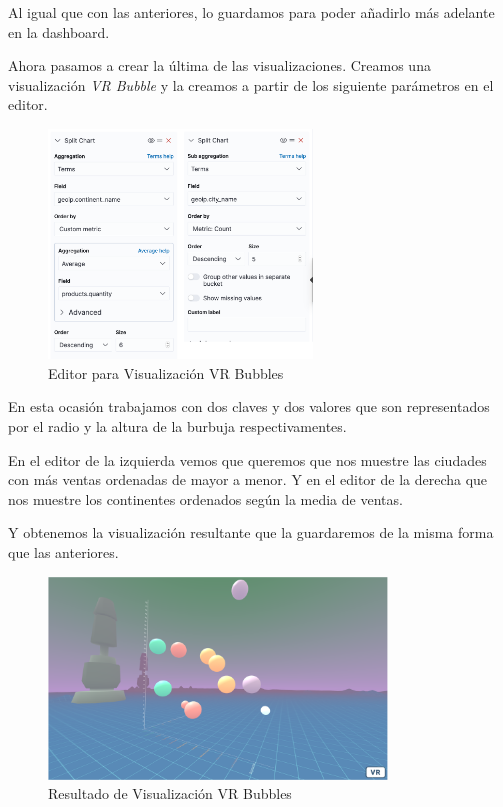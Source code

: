 \documentclass[a4paper, 12pt]{book}
\begin{document}
Al igual que con las anteriores, lo guardamos para poder añadirlo más adelante en la dashboard.

Ahora pasamos a crear la última de las visualizaciones. Creamos una visualización \textit{VR Bubble} y la creamos a partir de los siguiente parámetros en el editor.

\begin{figure}[H]
  \centering
  \includegraphics[width=7cm, keepaspectratio]{img/development/editor-bubbles.png}
  \caption{Editor para Visualización VR Bubbles}
  \label{fig:editorbubbles}
\end{figure}

En esta ocasión trabajamos con dos claves y dos valores que son representados por el radio y la altura de la burbuja respectivamentes.

En el editor de la izquierda vemos que queremos que nos muestre las ciudades con más ventas ordenadas de mayor a menor. Y en el editor de la derecha que nos muestre los continentes ordenados según la media de ventas.

Y obtenemos la visualización resultante que la guardaremos de la misma forma que las anteriores.

\begin{figure}[H]
  \centering
  \includegraphics[width=9cm, keepaspectratio]{img/development/visualizacion-bubble-use.png}
  \caption{Resultado de Visualización VR Bubbles}
  \label{fig:visualizacionbubbles}
\end{figure}
\end{document}
